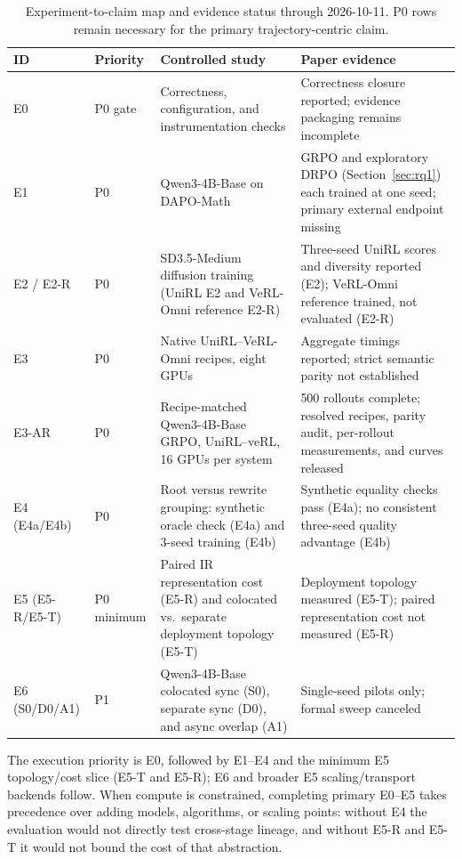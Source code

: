 \documentclass[10pt]{article}
\begin{document}
\begin{table}[H]
\caption{Experiment-to-claim map and evidence status through 2026-10-11. P0 rows remain necessary for the primary trajectory-centric claim.}
\label{tab:experiment-map}
\centering
\scriptsize
\begin{tabularx}{\textwidth}{@{}llL{0.31\textwidth}Y@{}}
\toprule
ID & Priority & Controlled study & Paper evidence \\
\midrule
E0 & P0 gate & Correctness, configuration, and instrumentation checks & Correctness closure reported; evidence packaging remains incomplete \\
E1 & P0 & Qwen3-4B-Base on DAPO-Math & GRPO and exploratory DRPO (Section~\ref{sec:rq1}) each trained at one seed; primary external endpoint missing \\
E2 / E2-R & P0 & SD3.5-Medium diffusion training (UniRL E2 and VeRL-Omni reference E2-R) & Three-seed UniRL scores and diversity reported (E2); VeRL-Omni reference trained, not evaluated (E2-R) \\
E3 & P0 & Native UniRL--VeRL-Omni recipes, eight GPUs & Aggregate timings reported; strict semantic parity not established \\
E3-AR & P0 & Recipe-matched Qwen3-4B-Base GRPO, UniRL--veRL, 16 GPUs per system & 500 rollouts complete; resolved recipes, parity audit, per-rollout measurements, and curves released \\
E4 (E4a/E4b) & P0 & Root versus rewrite grouping: synthetic oracle check (E4a) and 3-seed training (E4b) & Synthetic equality checks pass (E4a); no consistent three-seed quality advantage (E4b) \\
E5 (E5-R/E5-T) & P0 minimum & Paired IR representation cost (E5-R) and colocated vs.\ separate deployment topology (E5-T) & Deployment topology measured (E5-T); paired representation cost not measured (E5-R) \\
E6 (S0/D0/A1) & P1 & Qwen3-4B-Base colocated sync (S0), separate sync (D0), and async overlap (A1) & Single-seed pilots only; formal sweep canceled \\
\bottomrule
\end{tabularx}
\end{table}

The execution priority is E0, followed by E1--E4 and the minimum E5 topology/cost slice (E5-T and E5-R); E6 and broader E5 scaling/transport backends follow.
When compute is constrained, completing primary E0--E5 takes precedence over adding models, algorithms, or scaling points: without E4 the evaluation would not directly test cross-stage lineage, and without E5-R and E5-T it would not bound the cost of that abstraction.
\end{document}
